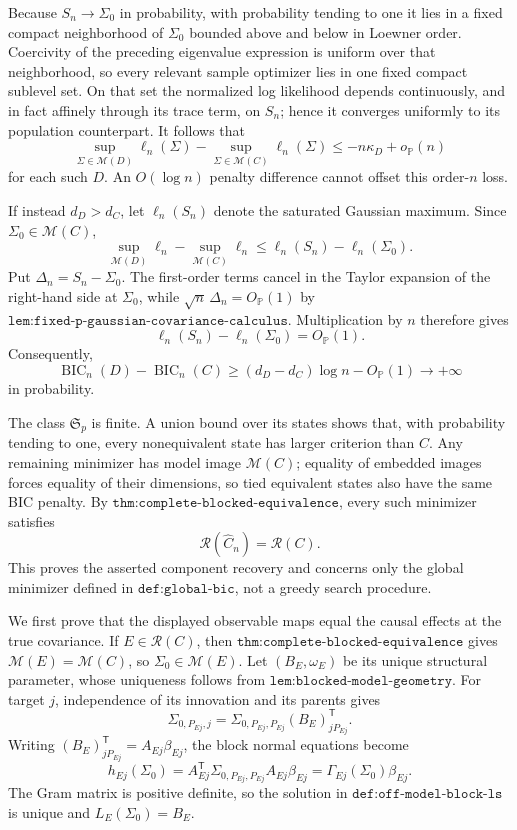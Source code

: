 Because \(S_n\to\Sigma_0\) in probability, with probability tending to one it lies in a fixed compact neighborhood of \(\Sigma_0\) bounded above and below in Loewner order. Coercivity of the preceding eigenvalue expression is uniform over that neighborhood, so every relevant sample optimizer lies in one fixed compact sublevel set. On that set the normalized log likelihood depends continuously, and in fact affinely through its trace term, on \(S_n\); hence it converges uniformly to its population counterpart. It follows that
\[
 \sup_{\Sigma\in\mathcal M(D)}\ell_n(\Sigma)
 -\sup_{\Sigma\in\mathcal M(C)}\ell_n(\Sigma)
 \leq -n\kappa_D+o_{\mathbb P}(n)
\]
for each such \(D\). An \(O(\log n)\) penalty difference cannot offset this order-\(n\) loss.

If instead \(d_D>d_C\), let \(\ell_n(S_n)\) denote the saturated Gaussian maximum. Since \(\Sigma_0\in\mathcal M(C)\),
\[
 \sup_{\mathcal M(D)}\ell_n-\sup_{\mathcal M(C)}\ell_n
 \leq \ell_n(S_n)-\ell_n(\Sigma_0).
\]
Put \(\Delta_n=S_n-\Sigma_0\). The first-order terms cancel in the Taylor expansion of the right-hand side at \(\Sigma_0\), while \(\sqrt n\,\Delta_n=O_{\mathbb P}(1)\) by \(\texttt{lem:fixed-p-gaussian-covariance-calculus}\). Multiplication by \(n\) therefore gives
\[
 \ell_n(S_n)-\ell_n(\Sigma_0)=O_{\mathbb P}(1).
\]
Consequently,
\[
 \operatorname{BIC}_n(D)-\operatorname{BIC}_n(C)
 \geq(d_D-d_C)\log n-O_{\mathbb P}(1)
 \longrightarrow+\infty
\]
in probability.

The class \(\mathfrak S_p\) is finite. A union bound over its states shows that, with probability tending to one, every nonequivalent state has larger criterion than \(C\). Any remaining minimizer has model image \(\mathcal M(C)\); equality of embedded images forces equality of their dimensions, so tied equivalent states also have the same BIC penalty. By \(\texttt{thm:complete-blocked-equivalence}\), every such minimizer satisfies
\[
 \mathcal R(\widehat C_n)=\mathcal R(C).
\]
This proves the asserted component recovery and concerns only the global minimizer defined in \(\texttt{def:global-bic}\), not a greedy search procedure.

We first prove that the displayed observable maps equal the causal effects at the true covariance. If \(E\in\mathcal R(C)\), then \(\texttt{thm:complete-blocked-equivalence}\) gives \(\mathcal M(E)=\mathcal M(C)\), so \(\Sigma_0\in\mathcal M(E)\). Let \((B_E,\omega_E)\) be its unique structural parameter, whose uniqueness follows from \(\texttt{lem:blocked-model-geometry}\). For target \(j\), independence of its innovation and its parents gives
\[
 \Sigma_{0,P_{Ej},j}=\Sigma_{0,P_{Ej},P_{Ej}}(B_E)_{jP_{Ej}}^{\mathsf T}.
\]
Writing \((B_E)_{jP_{Ej}}^{\mathsf T}=A_{Ej}\beta_{Ej}\), the block normal equations become
\[
 h_{Ej}(\Sigma_0)
 =A_{Ej}^{\mathsf T}\Sigma_{0,P_{Ej},P_{Ej}}A_{Ej}\beta_{Ej}
 =\Gamma_{Ej}(\Sigma_0)\beta_{Ej}.
\]
The Gram matrix is positive definite, so the solution in \(\texttt{def:off-model-block-ls}\) is unique and \(L_E(\Sigma_0)=B_E\).

